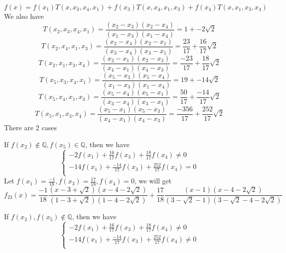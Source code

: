 \documentclass[english, 10pt]{article} %
\begin{document}
$$f(x) = f(x_1)T(x,x_3,x_4,x_1)+f(x_3)T(x,x_4,x_1,x_3)+f(x_4)T(x,x_1,x_3,x_4)$$
We also have
$$T(x_2,x_3,x_4,x_1) = \frac{(x_2-x_3)(x_2-x_4)}{(x_1-x_3)(x_1-x_4)} = 1+-2\sqrt{2}$$
$$T(x_2,x_4,x_1,x_3) = \frac{(x_2-x_4)(x_2-x_1)}{(x_3-x_4)(x_3-x_1)} = \frac{23}{17}+\frac{16}{17}\sqrt{2}$$
$$T(x_2,x_1,x_3,x_4) = \frac{(x_2-x_1)(x_2-x_3)}{(x_4-x_1)(x_4-x_3)}= \frac{-23}{17}+\frac{18}{17}\sqrt{2}$$
$$T(x_5,x_3,x_4,x_1) = \frac{(x_5-x_3)(x_5-x_4)}{(x_1-x_3)(x_1-x_4)} = 19+-14\sqrt{2}$$
$$T(x_5,x_4,x_1,x_3) = \frac{(x_5-x_4)(x_5-x_1)}{(x_3-x_4)(x_3-x_1)} = \frac{50}{17}+\frac{-14}{17}\sqrt{2}$$
$$T(x_5,x_1,x_3,x_4) = \frac{(x_5-x_1)(x_5-x_3)}{(x_4-x_1)(x_4-x_3)}= \frac{-356}{17}+\frac{252}{17}\sqrt{2}$$
There are 2 cases

If $f(x_2) \not \in \mathbb{Q}, f(x_5) \in \mathbb{Q}$, then we have
$$\begin{cases}
-2f(x_1)+\frac{16}{17}f(x_3)+\frac{18}{17}f(x_4) \neq 0\\
-14f(x_1)+\frac{-14}{17}f(x_3)+\frac{252}{17}f(x_4) = 0\\
\end{cases}$$
Let $f(x_1)=\frac{-1}{18}, f(x_3) = \frac{17}{18}, f(x_4) = 0$, we will get
$$f_{23}(x) = \frac{-1}{18} \frac{(x-3+\sqrt{2})(x-4-2\sqrt{2})}{(1-3+\sqrt{2})(1-4-2\sqrt{2})} + \frac{17}{18} \frac{(x-1)(x-4-2\sqrt{2})}{(3-\sqrt{2}-1)(3-\sqrt{2}-4-2\sqrt{2})}$$

If $f(x_2),f(x_5) \not \in \mathbb{Q}$, then we have
$$\begin{cases}
-2f(x_1)+\frac{16}{17}f(x_3)+\frac{18}{17}f(x_4) \neq 0\\
-14f(x_1)+\frac{-14}{17}f(x_3)+\frac{252}{17}f(x_4) \neq 0\\
\end{cases}$$
\end{document}
